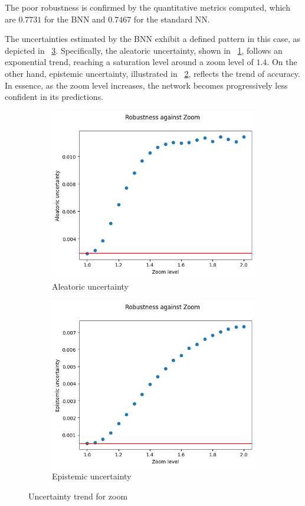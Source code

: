 The poor robustness is confirmed by the quantitative metrics computed, which are $0.7731$ for the BNN and $0.7467$ for the standard NN.

The uncertainties estimated by the BNN exhibit a defined pattern in this case, as depicted in \Fig~\ref{fig:zo_uncertainty}. Specifically, the aleatoric uncertainty, shown in \Fig~\ref{fig:zo_aleatoric}, follows an exponential trend, reaching a saturation level around a zoom level of $1.4$. On the other hand, epistemic uncertainty, illustrated in \Fig~\ref{fig:zo_epistemic}, reflects the trend of accuracy. In essence, as the zoom level increases, the network becomes progressively less confident in its predictions.

\begin{figure}[h]
	\centering
	\begin{subfigure}{.5\textwidth}
		\centering
		\includegraphics[width=0.9\linewidth]{ImageFiles/EvalBNN/ZO/aleatoric}
		\caption{Aleatoric uncertainty}
		\label{fig:zo_aleatoric}
	\end{subfigure}%
	\begin{subfigure}{.5\textwidth}
		\centering
		\includegraphics[width=0.9\linewidth]{ImageFiles/EvalBNN/ZO/epistemic}
		\caption{Epistemic uncertainty}
		\label{fig:zo_epistemic}
	\end{subfigure}
	\caption{Uncertainty trend for zoom}
	\label{fig:zo_uncertainty}
\end{figure}

